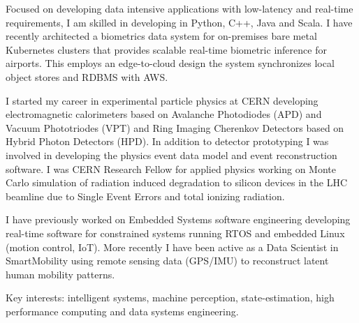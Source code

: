 

\begin{cvparagraph}

Focused on developing data intensive applications with low-latency and real-time requirements, 
I am skilled in developing in Python, C++, Java and Scala. I have recently architected
a biometrics data system for on-premises bare metal Kubernetes clusters that provides 
scalable real-time biometric inference for airports. This employs an edge-to-cloud design
the system synchronizes local object stores and RDBMS with AWS.

I started my career in experimental particle physics at CERN developing 
electromagnetic calorimeters based on Avalanche Photodiodes (APD) and 
Vacuum Phototriodes (VPT) and Ring Imaging Cherenkov Detectors based on 
Hybrid Photon Detectors (HPD). In addition to detector prototyping I was 
involved in developing the physics event data model and event reconstruction software. 
I was CERN Research Fellow for applied physics working on Monte Carlo simulation of 
radiation induced degradation to silicon devices in the LHC beamline due to Single Event Errors 
and total ionizing radiation.

I have previously worked on Embedded Systems software engineering developing real-time 
software for constrained systems running RTOS and embedded Linux (motion control, IoT). 
More recently I have been active as a Data Scientist in SmartMobility using 
remote sensing data (GPS/IMU) to reconstruct latent human mobility patterns.

Key interests: intelligent systems, machine perception, state-estimation, 
high performance computing and data systems engineering.
\end{cvparagraph}